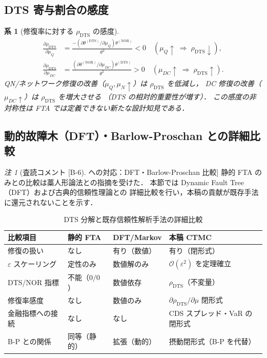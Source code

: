 \documentclass[12pt,a4paper]{article}
\theoremstyle{plain}
\newtheorem{corollary}[theorem]{系}
\theoremstyle{definition}
\theoremstyle{remark}
\newtheorem{remark}[theorem]{注}
\newcommand{\calO}{\mathcal{O}}
\newcommand{\eps}{\varepsilon}
\newcommand{\thetaNOR}{\theta^{(\mathrm{NOR})}}
\newcommand{\thetaDTS}{\theta^{(\mathrm{DTS})}}
\newcommand{\rhoDTS}{\rho_{\mathrm{DTS}}}
\begin{document}
\subsection{DTS 寄与割合の感度}

\begin{corollary}[修復率に対する $\rhoDTS$ の感度]\label{cor:rho_sens}
  \begin{align}
    \frac{\partial\rhoDTS}{\partial\mu_Q}
    &= \frac{-(\partial\thetaDTS/\partial\mu_Q)\thetaNOR}{\theta^2}
     < 0 \quad(\mu_Q \uparrow \;\Rightarrow\; \rhoDTS \downarrow),\\
    \frac{\partial\rhoDTS}{\partial\mu_{DC}}
    &= \frac{(\partial\thetaNOR/\partial\mu_{DC})\thetaDTS}{\theta^2}
     > 0 \quad(\mu_{DC} \uparrow \;\Rightarrow\; \rhoDTS \uparrow).
  \end{align}
  QN/ネットワーク修復の改善（$\mu_Q,\mu_{N}\uparrow$）は $\rhoDTS$ を低減し，
  DC 修復の改善（$\mu_{DC}\uparrow$）は $\rhoDTS$ を増大させる
  （DTS の相対的重要性が増す）．
  この感度の非対称性は FTA では定義できない新たな設計知見である．
\end{corollary}

\subsection{動的故障木（DFT）・Barlow-Proschan との詳細比較}

\begin{remark}[査読コメント [B-6] への対応：DFT・Barlow-Proschan 比較]
  静的 FTA のみとの比較は藁人形論法との指摘を受けた．
  本節では Dynamic Fault Tree（DFT）および古典的信頼性理論との
  詳細比較を行い，本稿の貢献が既存手法に還元されないことを示す．
\end{remark}

\begin{table}[H]
  \centering
  \caption{DTS 分解と既存信頼性解析手法の詳細比較}
  \label{tab:method_compare}
  \footnotesize
  \begin{tabular}{p{3.5cm}p{2.6cm}p{2.6cm}p{3.5cm}}
    \toprule
    比較項目 & 静的 FTA & DFT/Markov & 本稿 CTMC \\
    \midrule
    修復の扱い & なし & 有り（数値） & 有り（閉形式）\\
    $\eps$ スケーリング & 定性のみ & 数値解のみ & $\calO(\eps^2)$ を定理確立\\
    DTS/NOR 指標 & 不能（$0/0$）& 数値依存 & $\rhoDTS$（不変量）\\
    修復率感度 & なし & 数値のみ & $\partial\rhoDTS/\partial\mu$ 閉形式\\
    金融指標への接続 & なし & なし & CDS スプレッド・VaR の閉形式\\
    B-P との関係 & 同等（静的） & 拡張（動的） & 摂動閉形式（B-P を代替）\\
    \bottomrule
  \end{tabular}
\end{table}
\end{document}
